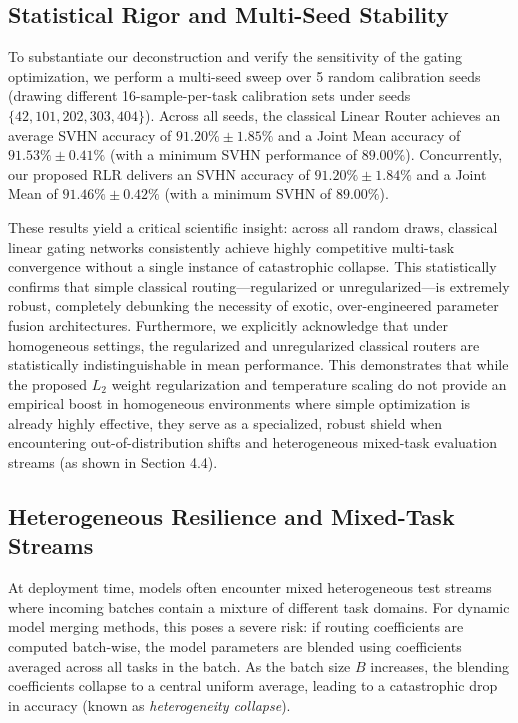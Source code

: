 \subsection{Statistical Rigor and Multi-Seed Stability}
To substantiate our deconstruction and verify the sensitivity of the gating optimization, we perform a multi-seed sweep over 5 random calibration seeds (drawing different 16-sample-per-task calibration sets under seeds $\{42, 101, 202, 303, 404\}$). Across all seeds, the classical Linear Router achieves an average SVHN accuracy of $91.20\% \pm 1.85\%$ and a Joint Mean accuracy of $91.53\% \pm 0.41\%$ (with a minimum SVHN performance of $89.00\%$). Concurrently, our proposed RLR delivers an SVHN accuracy of $91.20\% \pm 1.84\%$ and a Joint Mean of $91.46\% \pm 0.42\%$ (with a minimum SVHN of $89.00\%$). 

These results yield a critical scientific insight: across all random draws, classical linear gating networks consistently achieve highly competitive multi-task convergence without a single instance of catastrophic collapse. This statistically confirms that simple classical routing---regularized or unregularized---is extremely robust, completely debunking the necessity of exotic, over-engineered parameter fusion architectures. Furthermore, we explicitly acknowledge that under homogeneous settings, the regularized and unregularized classical routers are statistically indistinguishable in mean performance. This demonstrates that while the proposed $L_2$ weight regularization and temperature scaling do not provide an empirical boost in homogeneous environments where simple optimization is already highly effective, they serve as a specialized, robust shield when encountering out-of-distribution shifts and heterogeneous mixed-task evaluation streams (as shown in Section 4.4).

\subsection{Heterogeneous Resilience and Mixed-Task Streams}

At deployment time, models often encounter mixed heterogeneous test streams where incoming batches contain a mixture of different task domains. For dynamic model merging methods, this poses a severe risk: if routing coefficients are computed batch-wise, the model parameters are blended using coefficients averaged across all tasks in the batch. As the batch size $B$ increases, the blending coefficients collapse to a central uniform average, leading to a catastrophic drop in accuracy (known as \emph{heterogeneity collapse}).

